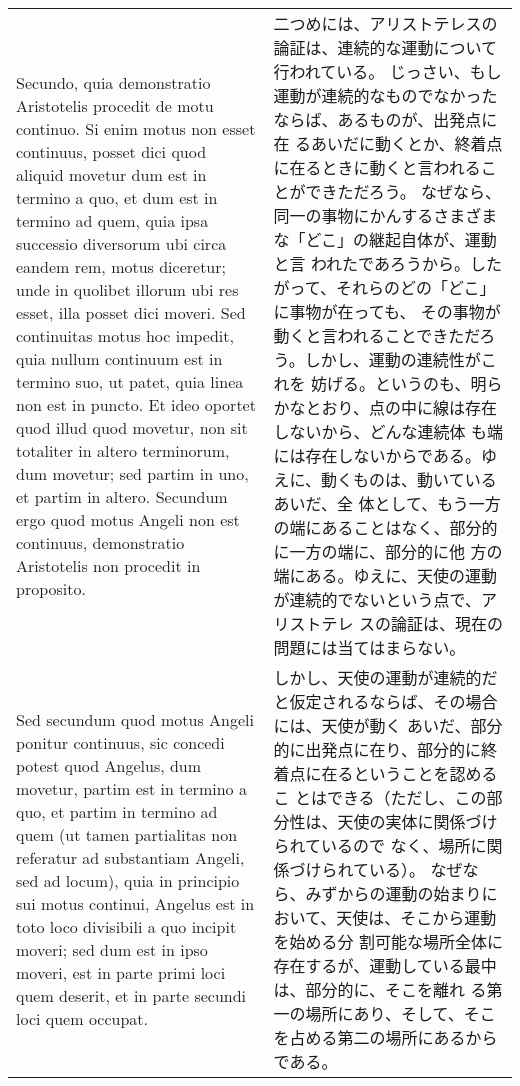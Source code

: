 \documentclass[10pt]{jsarticle} %
\begin{document}
\begin{longtable}{p{21em}p{21em}}
\\



Secundo, quia demonstratio Aristotelis procedit de motu
continuo. Si enim motus non esset continuus, posset dici quod aliquid
movetur dum est in termino a quo, et dum est in termino ad quem, quia
ipsa successio diversorum ubi circa eandem rem, motus diceretur; unde in
quolibet illorum ubi res esset, illa posset dici moveri. Sed continuitas
motus hoc impedit, quia nullum continuum est in termino suo, ut patet,
quia linea non est in puncto. Et ideo oportet quod illud quod movetur,
non sit totaliter in altero terminorum, dum movetur; sed partim in uno,
et partim in altero. Secundum ergo quod motus Angeli non est continuus,
demonstratio Aristotelis non procedit in proposito. 


&

二つめには、アリストテレスの論証は、連続的な運動について行われている。
じっさい、もし運動が連続的なものでなかったならば、あるものが、出発点に在
 るあいだに動くとか、終着点に在るときに動くと言われることができただろう。
 なぜなら、同一の事物にかんするさまざまな「どこ」の継起自体が、運動と言
 われたであろうから。したがって、それらのどの「どこ」に事物が在っても、
 その事物が動くと言われることできただろう。しかし、運動の連続性がこれを
 妨げる。というのも、明らかなとおり、点の中に線は存在しないから、どんな連続体
 も端には存在しないからである。ゆえに、動くものは、動いているあいだ、全
 体として、もう一方の端にあることはなく、部分的に一方の端に、部分的に他
 方の端にある。ゆえに、天使の運動が連続的でないという点で、アリストテレ
 スの論証は、現在の問題には当てはまらない。

\\

Sed secundum quod
motus Angeli ponitur continuus, sic concedi potest quod Angelus, dum
movetur, partim est in termino a quo, et partim in termino ad quem (ut
tamen partialitas non referatur ad substantiam Angeli, sed ad locum),
quia in principio sui motus continui, Angelus est in toto loco
divisibili a quo incipit moveri; sed dum est in ipso moveri, est in
parte primi loci quem deserit, et in parte secundi loci quem occupat. 

&

しかし、天使の運動が連続的だと仮定されるならば、その場合には、天使が動く
 あいだ、部分的に出発点に在り、部分的に終着点に在るということを認めるこ
 とはできる（ただし、この部分性は、天使の実体に関係づけられているので
 なく、場所に関係づけられている）。
なぜなら、みずからの運動の始まりにおいて、天使は、そこから運動を始める分
 割可能な場所全体に存在するが、運動している最中は、部分的に、そこを離れ
 る第一の場所にあり、そして、そこを占める第二の場所にあるからである。




\end{longtable}
\end{document}
